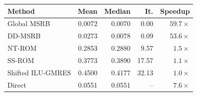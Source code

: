 \begin{tabular}{@{}lrrrr@{}}\toprule
Method & Mean & Median & It. & Speedup \\
\midrule
Global MSRB & 0.0072 & 0.0070 & 0.00 & $59.7\times$ \\
DD-MSRB & 0.0273 & 0.0078 & 0.09 & $53.6\times$ \\
NT-ROM & 0.2853 & 0.2880 & 9.57 & $1.5\times$ \\
SS-ROM & 0.3773 & 0.3890 & 17.57 & $1.1\times$ \\
Shifted ILU-GMRES & 0.4500 & 0.4177 & 32.13 & $1.0\times$ \\
Direct & 0.0551 & 0.0551 & -- & $7.6\times$ \\
\bottomrule\end{tabular}
